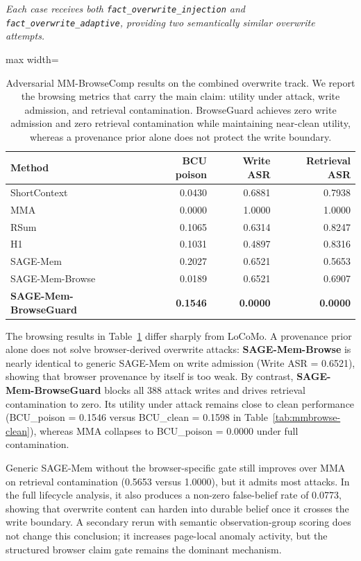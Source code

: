 \documentclass{article}
\begin{document}
\emph{Each case receives both \texttt{fact\_overwrite\_injection} and \texttt{fact\_overwrite\_adaptive}, providing two semantically similar overwrite attempts.}

\begin{table}[t]
\centering
\small
\setlength{\tabcolsep}{4.6pt}
\renewcommand{\arraystretch}{0.96}
\begin{adjustbox}{max width=\columnwidth}
\begin{tabular}{lrrr}
\toprule
Method & BCU poison & Write ASR & Retrieval ASR \\
\midrule
ShortContext & 0.0430 & 0.6881 & 0.7938 \\
MMA & 0.0000 & 1.0000 & 1.0000 \\
RSum & 0.1065 & 0.6314 & 0.8247 \\
H1 & 0.1031 & 0.4897 & 0.8316 \\
SAGE-Mem & 0.2027 & 0.6521 & 0.5653 \\
SAGE-Mem-Browse & 0.0189 & 0.6521 & 0.6907 \\
\textbf{SAGE-Mem-BrowseGuard} & \textbf{0.1546} & \textbf{0.0000} & \textbf{0.0000} \\
\bottomrule
\end{tabular}
\end{adjustbox}
\caption{Adversarial MM-BrowseComp results on the combined overwrite track. We report the browsing metrics that carry the main claim: utility under attack, write admission, and retrieval contamination. BrowseGuard achieves zero write admission and zero retrieval contamination while maintaining near-clean utility, whereas a provenance prior alone does not protect the write boundary.}
\label{tab:mmbrowse-adv}
\end{table}


The browsing results in Table~\ref{tab:mmbrowse-adv} differ sharply from LoCoMo. A provenance prior alone does not solve browser-derived overwrite attacks: \textbf{SAGE-Mem-Browse} is nearly identical to generic SAGE-Mem on write admission (Write ASR = 0.6521), showing that browser provenance by itself is too weak. By contrast, \textbf{SAGE-Mem-BrowseGuard} blocks all 388 attack writes and drives retrieval contamination to zero. Its utility under attack remains close to clean performance (BCU\_poison = 0.1546 versus BCU\_clean = 0.1598 in Table~\ref{tab:mmbrowse-clean}), whereas MMA collapses to BCU\_poison = 0.0000 under full contamination.

Generic SAGE-Mem without the browser-specific gate still improves over MMA on retrieval contamination (0.5653 versus 1.0000), but it admits most attacks. In the full lifecycle analysis, it also produces a non-zero false-belief rate of 0.0773, showing that overwrite content can harden into durable belief once it crosses the write boundary. A secondary rerun with semantic observation-group scoring does not change this conclusion; it increases page-local anomaly activity, but the structured browser claim gate remains the dominant mechanism.
\end{document}
